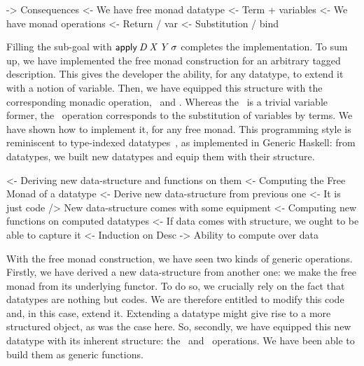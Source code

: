 \begin{wstructure}
    -> Consequences
        <- We have free monad datatype
            <- Term + variables
        <- We have monad operations
            <- Return / var
            <- Substitution / bind
\end{wstructure}

Filling the sub-goal with $\apply\: \V{D}\: \V{X}\: \V{Y}\:
\V{\sigma}$ completes the implementation. To sum up, we have
implemented the free monad construction for an arbitrary tagged
description. This gives the developer the ability, for any datatype,
to extend it with a notion of variable. Then, we have equipped this
structure with the corresponding monadic operation, \bind\ and
\return. Whereas the \return\ is a trivial variable former, the
\bind\ operation corresponds to the substitution of variables by
terms. We have shown how to implement it, for any free monad. This
programming style is reminiscent to type-indexed
datatypes~\cite{hinze:generic-haskell}, as implemented in Generic
Haskell: from datatypes, we built new datatypes and equip them with
their structure.

\begin{wstructure}
<- Deriving new data-structure and functions on them
    <- Computing the Free Monad of a datatype
        <- Derive new data-structure from previous one
            <- It is just code
        /> New data-structure comes with some equipment
    <- Computing new functions on computed datatypes
        <- If data comes with structure, we ought to be able to capture it
            <- Induction on Desc
            -> Ability to compute over data
\end{wstructure}

With the free monad construction, we have seen two kinds of generic
operations. Firstly, we have derived a new data-structure from another
one: we make the free monad from its underlying functor. To do so, we
crucially rely on the fact that datatypes are nothing but codes. We
are therefore entitled to modify this code and, in this case, extend
it. Extending a datatype might give rise to a more structured object,
as was the case here.  So, secondly, we have equipped this new
datatype with its inherent structure: the \bind\ and
\return\ operations. We have been able to build them as generic
functions.
